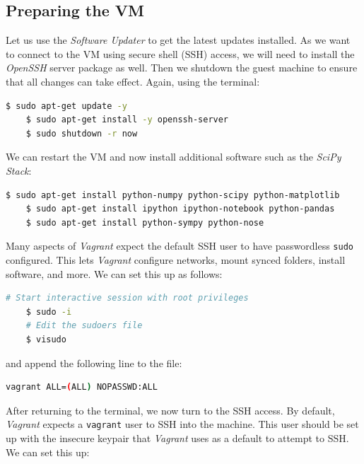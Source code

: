 \subsection*{Preparing the VM}
Let us use the \textit{Software Updater} to get the latest updates installed. As we want to connect to the VM using secure shell (SSH) access, we will need to install the \textit{OpenSSH} server package as well. Then we shutdown the guest machine to ensure that all changes can take effect. Again, using the terminal:
%
\vspace{0.2cm}\begin{lstlisting}[language=bash]
    $ sudo apt-get update -y
    $ sudo apt-get install -y openssh-server
    $ sudo shutdown -r now
\end{lstlisting}\vspace{0.2cm}
%
We can restart the VM and now install additional software such as the \textit{SciPy Stack}:
%
\vspace{0.2cm}\begin{lstlisting}[language=bash]
    $ sudo apt-get install python-numpy python-scipy python-matplotlib 
    $ sudo apt-get install ipython ipython-notebook python-pandas 
    $ sudo apt-get install python-sympy python-nose
\end{lstlisting}\vspace{0.2cm}
%
Many aspects of \textit{Vagrant} expect the default SSH user to have passwordless \verb+sudo+ configured. This lets  \textit{Vagrant} configure networks, mount synced folders, install software, and more. We can set this up as follows:
%
\vspace{0.2cm}\begin{lstlisting}[language=bash]
    # Start interactive session with root privileges
    $ sudo -i
    # Edit the sudoers file
    $ visudo
\end{lstlisting}\vspace{0.2cm}
%
and append the following line to the file:
%
\vspace{0.2cm}\begin{lstlisting}[language=bash]
    vagrant ALL=(ALL) NOPASSWD:ALL
\end{lstlisting}\vspace{0.2cm}
%
After returning to the terminal, we now turn to the SSH access. By default,  \textit{Vagrant} expects a \verb+vagrant+ user to SSH into the machine. This user should be set up with the insecure keypair that  \textit{Vagrant} uses as a default to attempt to SSH. We can set this up:
